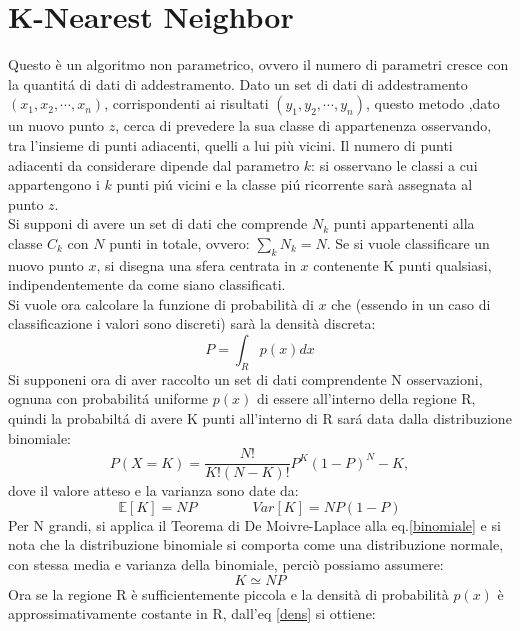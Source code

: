 \documentclass[a4paper,12pt]{report}
\begin{document}
\section{K-Nearest Neighbor}
Questo \`e un algoritmo non parametrico, ovvero il numero di parametri cresce con la quantit\'{a} di dati di addestramento.
Dato un set di dati di addestramento $(x_1,x_2,\cdots,x_n)$, corrispondenti ai risultati $(y_1,y_2,\cdots,y_n)$, questo metodo ,dato un nuovo punto $z$, cerca di prevedere la sua classe di appartenenza osservando, tra l'insieme di punti adiacenti, quelli a lui pi\`{u} vicini. Il numero di punti adiacenti da considerare dipende dal parametro $k$: si osservano le classi a cui appartengono i $k$ punti pi\'{u} vicini e la classe pi\'{u} ricorrente sar\`{a} assegnata al punto $z$.\\ 
Si supponi di avere un set di dati che comprende $N_k$ punti appartenenti alla classe $C_k$ con $N$ punti in totale, ovvero: $\sum_{k}N_k = N$. Se si vuole classificare un nuovo punto $x$, si disegna una sfera centrata in $x$ contenente  K punti qualsiasi, indipendentemente da come siano classificati.\\
Si vuole ora calcolare la funzione di probabilit\`{a} di $x$ che (essendo in un caso di classificazione i valori sono discreti) sar\`{a} la densit\`{a} discreta:
\begin{equation}\label{dens}
P=\int_R p(x) dx
\end{equation}
Si supponeni ora di aver raccolto un set di dati comprendente N osservazioni, ognuna con probabilit\'{a} uniforme $p(x)$ di essere all'interno della regione R, quindi la probabilt\'{a} di avere K punti all'interno di R sar\'{a} data dalla distribuzione binomiale:
\begin{equation} \label{binomiale}
P(X=K)=\frac{N!}{K!(N-K)!}P^K (1-P)^N-K,
\end{equation} 
dove il valore atteso e la varianza sono date da:
\begin{equation}
\mathbb{E}[K]=NP \qquad \qquad Var[K]=NP(1-P)
\end{equation}
Per N grandi, si applica il Teorema di De Moivre-Laplace alla eq.\ref{binomiale} e si nota che la distribuzione binomiale si comporta come una distribuzione normale, con stessa media e varianza della binomiale, perci\`{o} possiamo assumere:
\begin{equation} \label{eqbin1}
K\simeq NP
\end{equation}
Ora se la regione R \`{e} sufficientemente piccola e la densit\`{a} di probabilit\`{a} $p(x)$ \`{e} approssimativamente costante in R, dall'eq \ref{dens} si ottiene:
\end{document}
